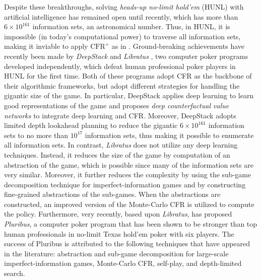 Despite these   breakthroughs, solving  \emph{heads-up no-limit hold'em} (HUNL) with artificial intelligence has remained open until recently, which has more than $6\times 10^{161}$ information sets, an astronomical number. Thus, in HUNL,  it is impossible (in today's computational power)  to traverse  all information sets, making it inviable to  apply  $\text{CFR}^{+}$ as in \cite{bowling2015heads}. Ground-breaking achievements have   recently been made by  \emph{DeepStack}  \cite{moravvcik2017deepstack} and \emph{Libratus}  \cite{brown2018superhuman}, two computer poker programs developed independently,  which defeat human professional poker players in HUNL for the first time. Both of these  programs adopt CFR as the backbone  of their algorithmic frameworks,  but  adopt different strategies for handling the gigantic size of the game. In particular, DeepStack applies  deep learning to learn good representations of the game and proposes \emph{deep counterfactual value networks} to integrate deep learning and CFR. Moreover, DeepStack adopts 
  limited depth lookahead planning to reduce the gigantic $6 \times 10^{161}$ information sets to no more than $10^{17}$ information sets, thus making it possible to enumerate all information sets.  
  In contrast, \emph{Libratus}   does not utilize any  deep learning techniques. Instead, it reduces the size of the game by computation of an abstraction of the game, which is possible since many of the information sets are very similar.  
  Moreover, it further reduces the complexity by using the  sub-game decomposition technique \cite{burch2014solving, moravcik2016refining, brown2017safe} for imperfect-information games and by constructing fine-grained abstractions  of the sub-games. When the abstractions are constructed, an improved version of the Monte-Carlo CFR \cite{lanctot2009monte, burch2012efficient,gibson2012generalized} is utilized to compute the policy. 
 Furthermore, very recently, based upon \emph{Libratus}, \cite{brown2019superhuman} has proposed  \emph{Pluribus}, a computer poker program  that has been shown to be stronger than top human professionals in   no-limit Texas hold'em poker with six players. The success of Pluribus is attributed to the  following  techniques that have appeared in the literature: abstraction and sub-game decomposition for large-scale imperfect-information games, Monte-Carlo CFR, self-play, and depth-limited search. 
    
